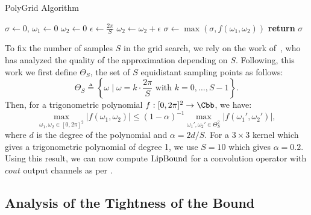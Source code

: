 \begin{algorithm}[htb]
  \caption{PolyGrid Algorithm} \label{algorithm:ch5-polygrid}
  \begin{algorithmic}[1]
      \State $\sigma \gets 0$, 
      \State $\omega_1 \gets 0$
      \State $\omega_2 \gets 0$
      \State $\epsilon \gets \frac{2\pi}{S}$
	  \State $\omega_2 \gets \omega_2 + \epsilon$
	  \State $\sigma \gets \max( \sigma, f(\omega_1, \omega_2))$
	\EndFor
      \EndFor
      \State \textbf{return} $\sigma$ 
    \EndProcedure
  \end{algorithmic}
\end{algorithm}


To fix the number of samples $S$ in the grid search, we rely on the work of~\cite{pfister2018bounding}, who has analyzed the quality of the approximation depending on $S$.
Following, this work we first define $\Theta_S$, the set of $S$ equidistant sampling points as follows:
\begin{equation}
  \Theta_S \triangleq \left\{ \omega \mid \omega = k \cdot \frac{2\pi}{S} \mbox{ with }  k = 0, \dots, S-1 \right\}.
\end{equation}
Then, for a trigonometric polynomial $f: [0, 2\pi]^2 \rightarrow \Cbb$, we have:
\begin{equation}
  \max_{\omega_1, \omega_2 \in [0,2\pi]^2} \left| f(\omega_1, \omega_2) \right| \leq (1 - \alpha)^{-1} \max_{\omega_1', \omega_2' \in \Theta_S^2} \left| f(\omega_1', \omega_2') \right|,
\end{equation}
where $d$ is the degree of the polynomial and $\alpha = 2d / S$.
For a $3\times3$ kernel which gives a trigonometric polynomial of degree 1, we use $S = 10$ which gives $\alpha = 0.2$.
Using this result, we can now compute $\mathrm{LipBound}$ for a convolution operator with $cout$ output channels as per .
 


\subsection{Analysis of the Tightness of the Bound}
\label{subsection:ch2-analysis_of_the_tightness_of_the_bound}


